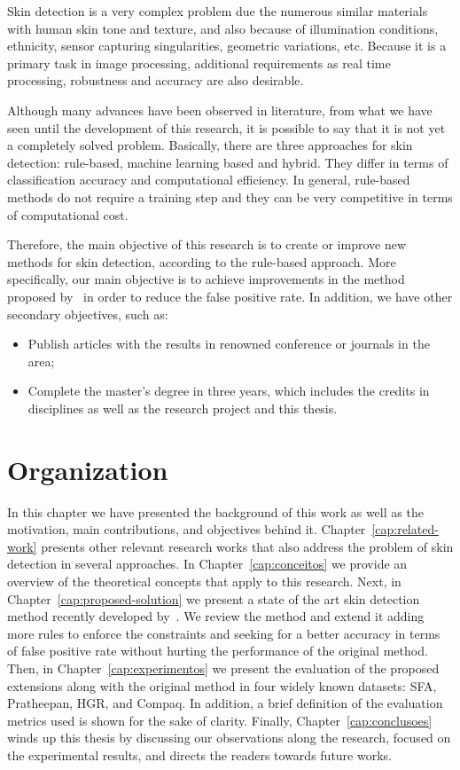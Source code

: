Skin detection is a very complex problem due the numerous similar materials with human skin tone and texture, and also because of illumination conditions, ethnicity, sensor capturing singularities, geometric variations, etc. Because it is a primary task in image processing, additional requirements as real time processing, robustness and accuracy are also desirable.

Although many advances have been observed in literature, from what we have seen until the development of this research, it is possible to say that it is not yet a completely solved problem. Basically, there are three approaches for skin detection: rule-based, machine learning based and hybrid. They differ in terms of classification accuracy and computational efficiency. In general, rule-based methods do not require a training step and they can be very competitive in terms of computational cost.

Therefore, the main objective of this research is to create or improve new methods for skin detection, according to the rule-based approach. More specifically, our main objective is to achieve improvements in the method proposed by~\citet{brancati:17} in order to reduce the false positive rate. In addition, we have other secondary objectives, such as:
\begin{itemize}
    \item Publish articles with the results in renowned conference or journals in the area;
    \item Complete the master's degree in three years, which includes the credits in disciplines as well as the research project and this thesis.
\end{itemize}



\section{Organization}
\label{sec:text_organization}
In this chapter we have presented the background of this work as well as the motivation, main contributions, and objectives behind it. Chapter~\ref{cap:related-work} presents other relevant research works that also address the problem of skin detection in several approaches. In Chapter~\ref{cap:conceitos} we provide an overview of the theoretical concepts that apply to this research. Next, in Chapter~\ref{cap:proposed-solution} we present a state of the art skin detection method recently developed by~\citet{brancati:17}. We review the method and extend it adding more rules to enforce the constraints and seeking for a better accuracy in terms of false positive rate without hurting the performance of the original method. Then, in Chapter~\ref{cap:experimentos} we present the evaluation of the proposed extensions along with the original method in four widely known datasets: SFA, Pratheepan, HGR, and Compaq. In addition, a
brief definition of the evaluation metrics used is shown for the sake of clarity. Finally, Chapter~\ref{cap:conclusoes} winds up this thesis by discussing our observations along the research, focused on the experimental results, and directs the readers towards future works.